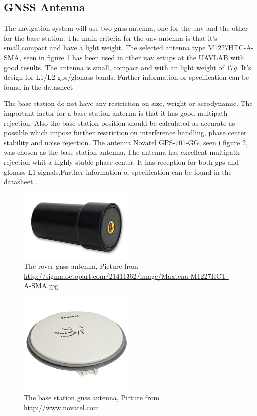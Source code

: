 \subsection{GNSS Antenna}
The navigation system will use two \gls{gnss} antenna, one for the \gls{uav} and the other for the base station. The main criteria for the \gls{uav} antenna is that it's small,compact and have a light weight.
The selected antenna type M1227HTC-A-SMA, seen in figure \ref{figure:Maxtena} has been used in other \gls{uav} setups at the UAVLAB with good results. The antenna is small, compact and with an light weight of $17g$. It's design for L1/L2 gps/glonass bands. Further information or specification can be found in the datasheet \citep{maxtena}

The base station do not have any restriction on size, weight or aerodynamic. The important factor for a base station antenna is that it has good multipath rejection. Also the base station position should be calculated as accurate as possible which impose further restriction on interference handling, phase center stability and noise rejection.
The antenna Novatel GPS-701-GG, seen i figure \ref{figure:Novatel}, was chosen as the base station antenna. The antenna has excellent multipath rejection whit a highly stable phase center. It has reception for both \gls{gps} and \gls{glonass} L1 signals.Further information or specification can be found in the datasheet \citep{novatel}.

\begin{figure}[H]
	\centering
		\includegraphics[width=0.5\textwidth]{figs/Maxtena-M1227HCT-A-SMA-image.jpg}
		\caption{The rover \gls{gnss} antenna, Picture from \url{http://sigma.octopart.com/21411362/image/Maxtena-M1227HCT-A-SMA.jpg}}
		\label{figure:Maxtena}
\end{figure}

\begin{figure}[H]
	\centering
		\includegraphics[width=0.5\textwidth]{figs/702-L.png}
		\caption{The base station \gls{gnss} antenna, Picture from \url{http://www.novatel.com}}
		\label{figure:Novatel}
\end{figure}


